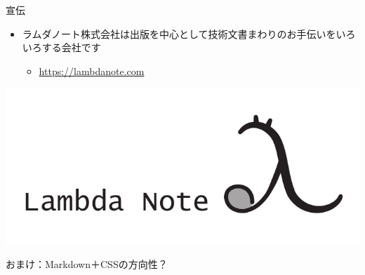 \documentclass[14pt,dvipdfmx,uplatex]{beamer}
\begin{document}
\begin{frame}[t]{\inhibitglue 宣伝}
  \sffamily
  \begin{itemize}
    \item ラムダノート株式会社は出版を中心として技術文書まわりのお手伝いをいろいろする会社です
    \begin{itemize}
      \item \url{https://lambdanote.com}
    \end{itemize}
  \end{itemize}
  \begin{center}
    \includegraphics[width=.5\textwidth]{figures/main-logo.pdf}
  \end{center}
\end{frame}

{%
\begin{frame}[t]{\inhibitglue おまけ：Markdown＋CSSの方向性？}
  \sffamily
  \begin{center}
  \end{center}
\end{frame}
}
\end{document}
